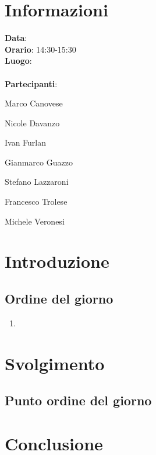 \section{Informazioni}
\textbf{Data}:\\
\textbf{Orario}: 14:30-15:30\\
\textbf{Luogo}:\\\\
\textbf{Partecipanti}:\begin{list}{*}{\setlength{\itemsep}{0cm}}
	\item Marco Canovese
	\item Nicole Davanzo
	\item Ivan Furlan
	\item Gianmarco Guazzo
	\item Stefano Lazzaroni
	\item Francesco Trolese
	\item Michele Veronesi
\end{list}
\section{Introduzione}
\subsection{Ordine del giorno}
\begin{enumerate}
	\item %
\end{enumerate}

\section{Svolgimento}
\subsection{Punto ordine del giorno} %

\section{Conclusione}

